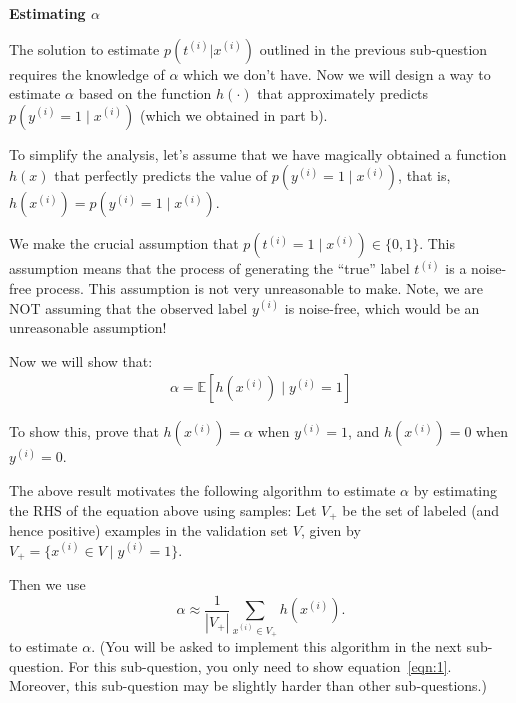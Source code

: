 \item {} \textbf{Estimating $\alpha$}


The solution to estimate $p(t^{(i)}|x^{(i)})$ outlined in the previous sub-question requires the knowledge of $\alpha$ which we don't have. Now we will design a way to estimate $\alpha$ based on the function $h(\cdot)$ that approximately predicts $p(y^{(i)}=1\mid x^{(i)})$ (which we obtained in part b).  

To simplify the analysis, let's assume that we have magically obtained a function $h(x)$ that perfectly predicts the value of $p(y^{(i)}=1\mid x^{(i)})$, that is, $h(x^{(i)} )= p(y^{(i)} = 1\mid x^{(i)})$.

We make the crucial assumption that $p(t^{(i)}=1\mid x^{(i)}) \in \{0,1\}$. This assumption means that the process of generating the ``true'' label $t^{(i)}$ is a noise-free process. This assumption is not very unreasonable to make. Note, we are NOT assuming that the observed label $y^{(i)}$ is noise-free, which would be an unreasonable assumption!

Now we will show that:
\begin{align}
\alpha = \mathbb{E}[h(x^{(i)})\mid y^{(i)}=1] \label{eqn:1}
\end{align}

To show this, prove that $h(x^{(i)}) = \alpha$ when $y^{(i)} = 1$, and $h(x^{(i)}) = 0$ when $y^{(i)} = 0$.

The above result motivates the following algorithm to estimate $\alpha$ by estimating the RHS of the equation above using samples: 
Let $V_{+}$ be the set of labeled (and hence positive) examples in the validation set $V$, given by $V_{+} = \{x^{(i)}\in V\mid y^{(i)} = 1\}$.

Then we use 
\begin{equation*}
\alpha \approx \frac{1}{|V_{+}|}\sum_{x^{(i)}\in V_{+}} h(x^{(i)}).
\end{equation*}
to estimate $\alpha$. (You will be asked to implement this algorithm in the next sub-question. For this sub-question, you only need to show equation~\eqref{eqn:1}. Moreover, this sub-question may be slightly harder than other sub-questions.)

